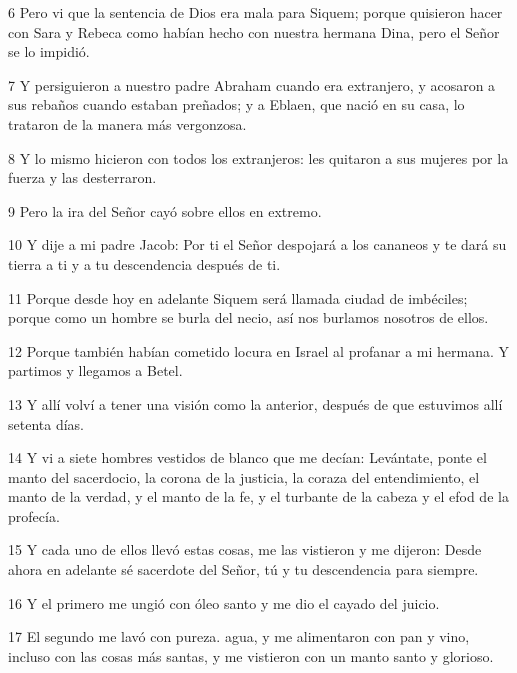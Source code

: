 \par 6 Pero vi que la sentencia de Dios era mala para Siquem; porque quisieron hacer con Sara y Rebeca como habían hecho con nuestra hermana Dina, pero el Señor se lo impidió.

\par 7 Y persiguieron a nuestro padre Abraham cuando era extranjero, y acosaron a sus rebaños cuando estaban preñados; y a Eblaen, que nació en su casa, lo trataron de la manera más vergonzosa.

\par 8 Y lo mismo hicieron con todos los extranjeros: les quitaron a sus mujeres por la fuerza y ​​las desterraron.

\par 9 Pero la ira del Señor cayó sobre ellos en extremo.

\par 10 Y dije a mi padre Jacob: Por ti el Señor despojará a los cananeos y te dará su tierra a ti y a tu descendencia después de ti.

\par 11 Porque desde hoy en adelante Siquem será llamada ciudad de imbéciles; porque como un hombre se burla del necio, así nos burlamos nosotros de ellos.

\par 12 Porque también habían cometido locura en Israel al profanar a mi hermana. Y partimos y llegamos a Betel.

\par 13 Y allí volví a tener una visión como la anterior, después de que estuvimos allí setenta días.

\par 14 Y vi a siete hombres vestidos de blanco que me decían: Levántate, ponte el manto del sacerdocio, la corona de la justicia, la coraza del entendimiento, el manto de la verdad, y el manto de la fe, y el turbante de la cabeza y el efod de la profecía.

\par 15 Y cada uno de ellos llevó estas cosas, me las vistieron y me dijeron: Desde ahora en adelante sé sacerdote del Señor, tú y tu descendencia para siempre.

\par 16 Y el primero me ungió con óleo santo y me dio el cayado del juicio.

\par 17 El segundo me lavó con pureza. agua, y me alimentaron con pan y vino, incluso con las cosas más santas, y me vistieron con un manto santo y glorioso.

